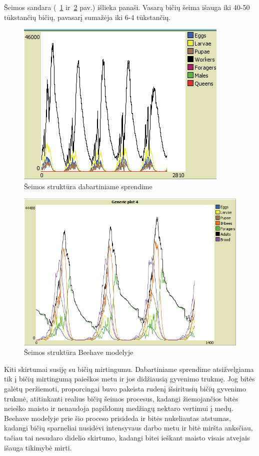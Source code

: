 \documentclass{VUMIFPSmagistrinis}
\begin{document}
Šeimos sandara (~\ref{img:m7} ir~\ref{img:m8} pav.) išlieka panaši. Vasarą bičių šeima išauga iki 40-50 tūkstančių bičių, pavasarį sumažėja iki 6-4 tūkstančių.

\begin{figure}[H]
    \centering
    \includegraphics[scale=0.75]{img/mtd3/mtdp3v11-img007.png}
    \caption{Šeimos struktūra dabartiniame sprendime}
    \label{img:m7}
\end{figure}

\begin{figure}[H]
    \centering
    \includegraphics[scale=0.75]{img/mtd3/mtdp3v11-img008.png}
    \caption{Šeimos struktūra Beehave modelyje}
    \label{img:m8}
\end{figure}


Kiti skirtumai susiję su bičių mirtingumu. Dabartiniame sprendime atsižvelgiama tik į bičių mirtingumą paieškos metu ir jos didžiausią gyvenimo trukmę. Jog bitės galėtų peržiemoti, proporcingai buvo pakeista rudenį išsiritusių bičių gyvenimo trukmė, atitinkanti realius bičių šeimos procesus, kadangi žiemojančios bitės neieško maisto ir nenaudoja papildomų medžiagų nektaro vertimui į medų.  Beehave modelyje prie šio proceso prisideda ir bitės nukeliautas atstumas, kadangi bičių sparneliai nusidėvi intensyvaus darbo metu ir bitė miršta anksčiau, tačiau tai nesudaro didelio skirtumo, kadangi bitei ieškant maisto visais atvejais išauga tikimybė mirti.
\end{document}
